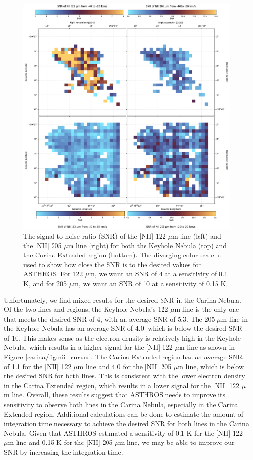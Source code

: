 \begin{figure}
    \centering
    \includegraphics[width=.9\textwidth]{figs/carina/snr.png}
    \caption[SNR of the {[}NII{]} 122 $\mu$m and 205 $\mu$m Lines in the Carina Nebula]{
        The signal-to-noise ratio (SNR) of the [NII] 122 $\mu$m line (left) and the [NII] 205 $\mu$m line (right) for both the Keyhole Nebula (top) and the Carina Extended region (bottom).
        The diverging color scale is used to show how close the SNR is to the desired values for ASTHROS.
        For 122 $\mu$m, we want an SNR of 4 at a sensitivity of 0.1 K, and for 205 $\mu$m, we want an SNR of 10 at a sensitivity of 0.15 K.
        }
    \label{carina/fig:snr}
\end{figure}

Unfortunately, we find mixed results for the desired SNR in the Carina Nebula. 
Of the two lines and regions, the Keyhole Nebula's 122 $\mu$m line is the only one that meets the desired SNR of 4, with an average SNR of 5.3.
The 205 $\mu$m line in the Keyhole Nebula has an average SNR of 4.0, which is below the desired SNR of 10.
This makes sense as the electron density is relatively high in the Keyhole Nebula, which results in a higher signal for the [NII] 122 $\mu$m line as shown in Figure \ref{carina/fig:nii_curves}.
The Carina Extended region has an average SNR of 1.1 for the [NII] 122 $\mu$m line and 4.0 for the [NII] 205 $\mu$m line, which is below the desired SNR for both lines.
This is consistent with the lower electron density in the Carina Extended region, which results in a lower signal for the [NII] 122 $\mu$m line.
Overall, these results suggest that ASTHROS needs to improve its sensitivity to observe both lines in the Carina Nebula, especially in the Carina Extended region.
Additional calculations can be done to estimate the amount of integration time necessary to achieve the desired SNR for both lines in the Carina Nebula.
Given that ASTHROS estimated a sensitivity of 0.1 K for the [NII] 122 $\mu$m line and 0.15 K for the [NII] 205 $\mu$m line, we may be able to improve our SNR by increasing the integration time.